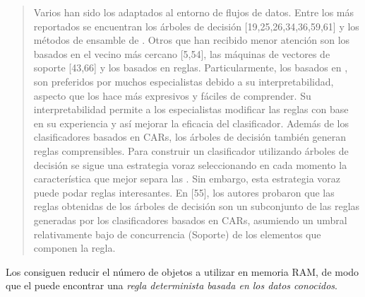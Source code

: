 \begin{quote}
Varios han sido los \clasificadores adaptados al entorno de flujos de datos. Entre los más reportados se encuentran los árboles de decisión [19,25,26,34,36,59,61] y los métodos de ensamble de \clasificadores [9,39,47,51,57]. Otros \clasificadores que han recibido menor atención son los basados en el vecino más cercano [5,54], las máquinas de vectores de soporte [43,66] y los basados en reglas. Particularmente, los \clasificadores basados en \CARs, son preferidos por muchos especialistas debido a su interpretabilidad, aspecto que los hace más expresivos y fáciles de comprender. Su interpretabilidad permite a los especialistas modificar las reglas con base en su experiencia y así mejorar la eficacia del clasificador. Además de los clasificadores basados en CARs, los árboles de decisión también generan reglas comprensibles. Para construir un clasificador utilizando árboles de decisión se sigue una estrategia voraz seleccionando en cada momento la característica que mejor separa las \clases. Sin embargo, esta estrategia voraz puede podar reglas interesantes. En [55], los autores probaron que las reglas obtenidas de los árboles de decisión son un subconjunto de las reglas generadas por los clasificadores basados en CARs, asumiendo un umbral relativamente bajo de concurrencia (Soporte) de los elementos que componen la regla.
\end{quote}

Los \catalogos consiguen reducir el número de objetos a utilizar en memoria RAM, de modo que el \clasificador puede encontrar una \emph{regla determinista basada en los datos conocidos}.
